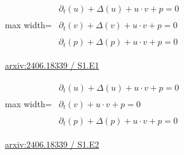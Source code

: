 \documentclass[UTF8,10pt,a4paper,fontset=mac]{ctexart}
\begin{document}
\begin{minipage}{\linewidth}\begin{center}\begin{adjustbox}{max width=\linewidth}$\displaystyle\begin{gathered}\begin{gathered}\partial_{t}(u)+\Delta(u)+u\cdot v+p=0\end{gathered}\\[5pt]\begin{gathered}\partial_{t}(v)+\Delta(v)+u\cdot v+p=0\end{gathered}\\[5pt]\begin{gathered}\partial_{t}(p)+\Delta(p)+u\cdot v+p=0\end{gathered}\end{gathered}$\end{adjustbox}\end{center}{\small\href{https://arxiv.org/html/2406.18339#S1.E1}{arxiv:2406.18339 / S1.E1}}\par\end{minipage}\par\vspace{6mm}

\begin{minipage}{\linewidth}\begin{center}\begin{adjustbox}{max width=\linewidth}$\displaystyle\begin{gathered}\begin{gathered}\partial_{t}(u)+\Delta(u)+u\cdot v+p=0\end{gathered}\\[5pt]\begin{gathered}\partial_{t}(v)+u\cdot v+p=0\end{gathered}\\[5pt]\begin{gathered}\partial_{t}(p)+\Delta(p)+u\cdot v+p=0\end{gathered}\end{gathered}$\end{adjustbox}\end{center}{\small\href{https://arxiv.org/html/2406.18339#S1.E2}{arxiv:2406.18339 / S1.E2}}\par\end{minipage}\par\vspace{6mm}
\end{document}
